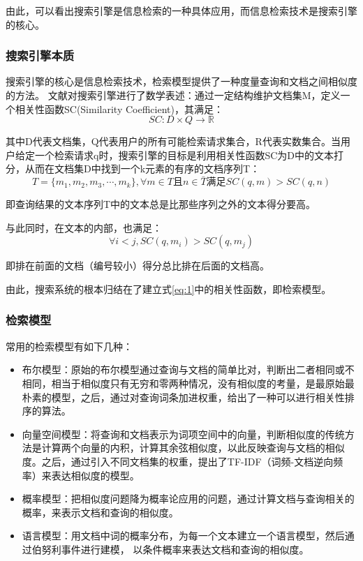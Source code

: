 \documentclass[12pt,a4paper]{article}
\begin{document}
	由此，可以看出搜索引擎是信息检索的一种具体应用，而信息检索技术是搜索引擎的核心。
		\subsubsection{搜索引擎本质}
	搜索引擎的核心是信息检索技术，检索模型提供了一种度量查询和文档之间相似度的方法。\nocite{24} 文献\cite{25}对搜索引擎进行了数学表述：通过一定结构维护文档集M，定义一个相关性函数SC(Similarity Coefficient)，其满足：
	\begin{equation}\label{eq:1}
	 SC: D \times Q \longrightarrow \mathbb{R}
	\end{equation}
	
	其中D代表文档集，Q代表用户的所有可能检索请求集合，R代表实数集合。当用户给定一个检索请求q时，搜索引擎的目标是利用相关性函数SC为D中的文本打分，从而在文档集D中找到一个k元素的有序的文档序列T：
	\begin{equation}
	T=\{ m_{1},m_{2},m_{3},\cdots, m_{k} \},\forall m \in T 且 n \in \bar{T} 满足 SC(q,m)>SC(q,n)
	\end{equation}
	
	即查询结果的文本序列T中的文本总是比那些序列之外的文本得分要高。
	
	与此同时，在文本的内部，也满足：
	\begin{equation}
	\forall i < j, SC(q,m_{i})>SC(q,m_{j})
	\end{equation}
	
	即排在前面的文档（编号较小）得分总比排在后面的文档高。
	
	由此，搜索系统的根本归结在了建立式\ref{eq:1}中的相关性函数，即检索模型。
		\subsubsection{检索模型}
	常用的检索模型有如下几种：
	\begin{itemize}
		\item
	布尔模型：原始的布尔模型通过查询与文档的简单比对，判断出二者相同或不相同，相当于相似度只有无穷和零两种情况，没有相似度的考量，是最原始最朴素的模型，之后，通过对查询词条加进权重，给出了一种可以进行相关性排序的算法。\cite{salton1970}
		\item
	向量空间模型：将查询和文档表示为词项空间中的向量，判断相似度的传统方法是计算两个向量的内积，计算其余弦相似度，以此反映查询与文档的相似度。\cite{salton1975}之后，通过引入不同文档集的权重，提出了TF-IDF（词频-文档逆向频率）\cite{robertson1976}来表达相似度的模型。
		\item
	概率模型：把相似度问题降为概率论应用的问题，通过计算文档与查询相关的概率，来表示文档和查询的相似度。
		\item
	语言模型：用文档中词的概率分布，为每一个文本建立一个语言模型，然后通过伯努利事件进行建模， 以条件概率来表达文档和查询的相似度。\cite{ponte1998}
	\end{itemize}
	
\end{document}
